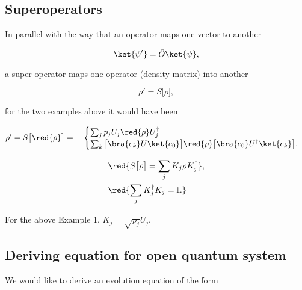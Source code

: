 \subsection{Superoperators}
In parallel with the way that an operator maps one vector to another

\begin{equation}
\ket{\psi'}=\hat{O}\ket{\psi},
\end{equation}

\noindent a super-operator maps one operator (density matrix) into another

\begin{equation}
\rho'=S\big[\rho\big],
\end{equation}

\noindent for the two examples above it would have been

\begin{equation}
\rho' = S\big[\red{\rho}\big] = \quad
\begin{cases}
\sum_jp_jU_j\red{\rho} U_j^\dagger\\
\sum_k\big[\bra{e_k}U\ket{e_0}\big]\red{\rho}\big[\bra{e_0} U^\dagger\ket{e_k}\big].
\end{cases}
\end{equation}

\noindent{}

\begin{equation}
\begin{aligned}
& \red{S\big[\rho\big] = \sum_jK_j\rho K_j^\dagger},\\
& \red{\sum_jK_j^\dagger K_j = \mathbb{I}.}
\end{aligned}
\end{equation}

\noindent For the above Example 1, $K_j = \sqrt{p_j}U_j$.


\subsection{Deriving equation for open quantum system}
We would like to derive an evolution equation of the form

